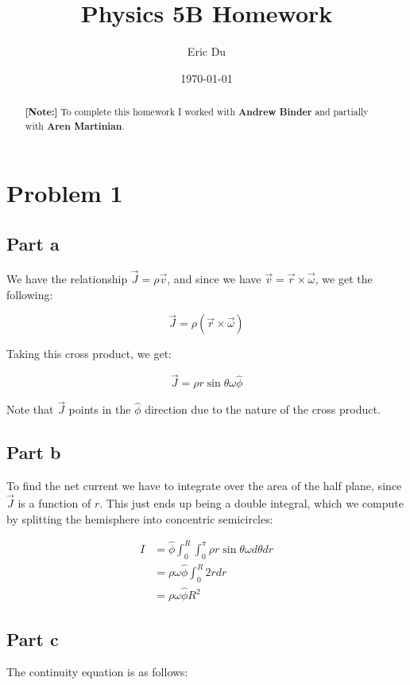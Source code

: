 \documentclass{article}
\title{Physics 5B Homework}
\author{Eric Du}
\date{\today}
\theoremstyle{definition}
\numberwithin{equation}{section}
\numberwithin{definition}{section}
\begin{document}
\maketitle

\begin{abstract}
    \noindent \textbf{[Note:]} To complete this homework I worked with \textbf{Andrew Binder} and partially with \textbf{Aren Martinian}.
    \end{abstract}

\section{Problem 1}

\subsection{Part a}
We have the relationship $\vec{J} = \rho \vec{v}$, and since we have $\vec{v} = \vec{r} \times \vec{\omega}$, we get the following:

   \[ \vec{J} = \rho (\vec{r} \times \vec{\omega})\]

Taking this cross product, we get:

\[ \vec{J} = \rho r\sin \theta \omega \hat{\phi}\]

Note that $\vec{J}$ points in the $\hat \phi$ direction due to the nature of the cross product.

\subsection{Part b}

To find the net current we have to integrate over the area of the half plane, since $\vec{J}$ is a function of $r$. This just ends up being a double integral, which we compute by splitting the hemisphere into concentric semicircles: 

\begin{align*}
    I &= \hat \phi \int_0^R\int_0^\pi \rho r \sin \theta \omega d\theta dr\\
    &= \rho \omega \hat \phi \int_0^R 2r dr\\
    &=  \rho \omega \hat \phi R^2
\end{align*}

\subsection{Part c}

The continuity equation is as follows: 
\end{document}
